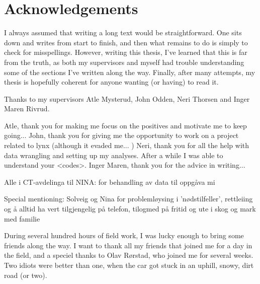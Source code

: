 \chapter{Acknowledgements}

I always assumed that writing a long text would be straightforward. One sits down and writes from start to finish, and then what remains to do is simply to check for misspellings.
However, writing this thesis, I've learned that this is far from the truth, as both my supervisors and myself had trouble understanding some of the sections I've written along the way.
Finally, after many attempts, my thesis is hopefully coherent for anyone wanting (or having) to read it.

Thanks to my supervisors Atle Mysterud, John Odden, Neri Thorsen and Inger Maren Rivrud.

Atle, thank you for making me focus on the positives and motivate me to keep going...
John, thank you for giving me the opportunity to work on a project related to lynx (although it evaded me... )
Neri, thank you for all the help with data wrangling and setting up my analyses. After a while I was able to understand your <codes>.
Inger Maren, thank you for the advice in writing...


Alle i CT-avdelinga til NINA: for behandling av data til oppgåva mi

Special mentioning: Solveig og Nina for problemløysing i 'nødstilfeller', rettleiing og å alltid ha vert tilgjengelig på telefon, tilogmed på fritid og ute i skog og mark med familie

During several hundred hours of field work, I was lucky enough to bring some friends along the way.
I want to thank all my friends that joined me for a day in the field, and a speciel thanks to Olav Rørstad, who joined me for several weeks. Two idiots were better than one, when the car got stuck in an uphill, snowy, dirt road (or two).